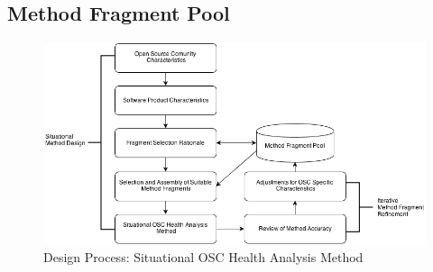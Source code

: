 \documentclass[final,5p,times,twocolumn]{elsarticle}
\begin{document}
\subsection{Method Fragment Pool}
\begin{figure}
\begin{center}
\includegraphics[scale=0.55]{figures/Situational_Method_Design.png}
\caption{Design Process: Situational OSC Health Analysis Method}
\label{fig:OSC_model}
\end{center}
\end{figure} 
\end{document}
